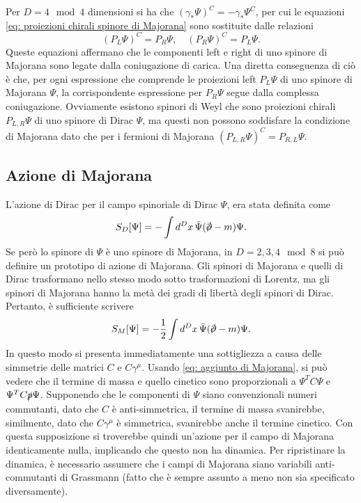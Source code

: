Per $D = 4\mod{4}$ dimensioni si ha che $(\gamma_*\Psi)^C = -\gamma_*\Psi^C$, per cui le equazioni \eqref{eq: proiezioni chirali spinore di Majorana} sono sostituite dalle relazioni 
\begin{equation}
    (P_L\Psi)^C = P_R\Psi,\quad (P_R\Psi)^C = P_L\Psi.
\end{equation}
Queste equazioni affermano che le componenti left e right di uno spinore di Majorana sono legate dalla coniugazione di carica. Una diretta conseguenza di ciò è che, per ogni espressione che comprende le proiezioni left $P_L\Psi$ di uno spinore di Majorana $\Psi$, la corrispondente espressione per $P_R\Psi$ segue dalla complessa coniugazione. Ovviamente esistono spinori di Weyl che sono proiezioni chirali $P_{L,R}\Psi$ di uno spinore di Dirac $\Psi$, ma questi non possono soddisfare la condizione di Majorana dato che per i fermioni di Majorana $(P_{L,R}\Psi)^C = P_{R,L}\Psi$. 

\subsection{Azione di Majorana}
L'azione di Dirac per il campo spinoriale di Dirac $\Psi$, era stata definita come 
\begin{equation}
\label{eq: azione di Dirac}
    S_D[\Psi] = -\int d^Dx\,\b{\Psi}(\sl{\p} - m)\Psi.
\end{equation}
Se però lo spinore di $\Psi$ è uno spinore di Majorana, in $D = 2,3,4\mod{8}$ si può definire un prototipo di azione di Majorana. Gli spinori di Majorana e quelli di Dirac trasformano nello stesso modo sotto trasformazioni di Lorentz, ma gli spinori di Majorana hanno la metà dei gradi di libertà degli spinori di Dirac. Pertanto, è sufficiente scrivere
\begin{equation}
\label{eq: azione di Majorana}
    S_M[\Psi] = -\frac{1}{2}\int d^Dx\,\b{\Psi}(\sl{\p} - m)\Psi.
\end{equation}
In questo modo si presenta immediatamente una sottigliezza a causa delle simmetrie delle matrici $C$ e $C\gamma^\mu$. Usando \eqref{eq: aggiunto di Majorana}, si può vedere che il termine di massa e quello cinetico sono proporzionali a $\Psi^TC\Psi$ e $\Psi^TC\sl{p}\Psi$. Supponendo che le componenti di $\Psi$ siano convenzionali numeri commutanti, dato che $C$ è anti-simmetrica, il termine di massa svanirebbe, similmente, dato che $C\gamma^\mu$ è simmetrica, svanirebbe anche il termine cinetico. Con questa supposizione si troverebbe quindi un'azione per il campo di Majorana identicamente nulla, implicando che questo non ha dinamica. Per ripristinare la dinamica, è necessario assumere che i campi di Majorana siano variabili anti-commutanti di Grassmann (fatto che è sempre assunto a meno non sia specificato diversamente). 

